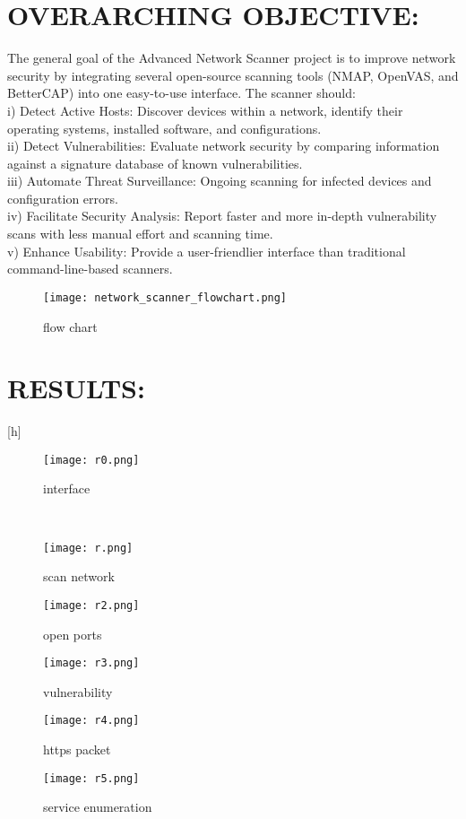 \documentclass[conference]{IEEEtran}
\begin{document}
\section{OVERARCHING OBJECTIVE:}
The general goal of the Advanced Network Scanner project is to improve network security by integrating several open-source scanning tools (NMAP, OpenVAS, and BetterCAP) into one easy-to-use interface. The scanner should:\\

i) Detect Active Hosts: Discover devices within a network, identify their operating systems, installed software, and configurations.\\
ii) Detect Vulnerabilities: Evaluate network security by comparing information against a signature database of known vulnerabilities.\\
iii) Automate Threat Surveillance: Ongoing scanning for infected devices and configuration errors.\\
iv) Facilitate Security Analysis: Report faster and more in-depth vulnerability scans with less manual effort and scanning time.\\
v) Enhance Usability: Provide a user-friendlier interface than traditional command-line-based scanners.\\
\begin{figure}[h]
    \centering
    \texttt{[image: network\_scanner\_flowchart.png]}
    \caption{flow chart}
    \label{fig:enter-label}
\end{figure}

\section{RESULTS:}[h]
\begin{figure}[h]
    \centering
    \texttt{[image: r0.png]}
    \caption{interface}
    \label{fig:enter-label}
\end{figure}
\\
\begin{figure}[h]
    \centering
    \texttt{[image: r.png]}
    \caption{scan network}
    \label{fig:enter-label}
\end{figure}
\begin{figure}[h]
    \centering
    \texttt{[image: r2.png]}
    \caption{open ports}
    \label{fig:enter-label}
\end{figure}
\begin{figure}[h]
    \centering
    \texttt{[image: r3.png]}
    \caption{vulnerability}
    \label{fig:enter-label}
\end{figure}
\begin{figure}[h]
    \centering
    \texttt{[image: r4.png]}
    \caption{https packet}
    \label{fig:enter-label}
\end{figure}
\begin{figure}[h]
    \centering
    \texttt{[image: r5.png]}
    \caption{service enumeration}
    \label{fig:enter-label}
\end{figure}
\end{document}
